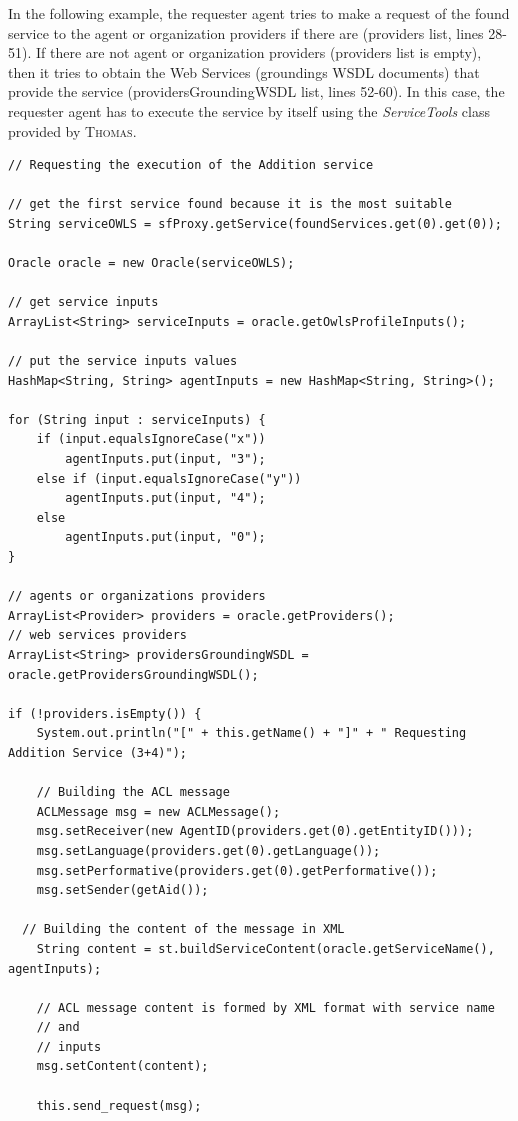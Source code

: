 In the following example, the requester agent tries to make a request of the found service to the agent or organization providers if there are (providers list, lines 28-51). If there are not agent or organization providers (providers list is empty), then it tries to obtain the Web Services (groundings WSDL documents) that provide the service (providersGroundingWSDL list, lines 52-60). In this case, the requester agent has to execute the service by itself using the \textit{ServiceTools} class provided by \textsc{Thomas}.



\begin{lstlisting}
// Requesting the execution of the Addition service

// get the first service found because it is the most suitable
String serviceOWLS = sfProxy.getService(foundServices.get(0).get(0));

Oracle oracle = new Oracle(serviceOWLS);

// get service inputs
ArrayList<String> serviceInputs = oracle.getOwlsProfileInputs();

// put the service inputs values
HashMap<String, String> agentInputs = new HashMap<String, String>();

for (String input : serviceInputs) {
	if (input.equalsIgnoreCase("x"))
		agentInputs.put(input, "3");
	else if (input.equalsIgnoreCase("y"))
		agentInputs.put(input, "4");
	else
		agentInputs.put(input, "0");
}

// agents or organizations providers
ArrayList<Provider> providers = oracle.getProviders();
// web services providers
ArrayList<String> providersGroundingWSDL = oracle.getProvidersGroundingWSDL();

if (!providers.isEmpty()) {
	System.out.println("[" + this.getName() + "]" + " Requesting Addition Service (3+4)");

	// Building the ACL message
	ACLMessage msg = new ACLMessage();
	msg.setReceiver(new AgentID(providers.get(0).getEntityID()));
	msg.setLanguage(providers.get(0).getLanguage());
	msg.setPerformative(providers.get(0).getPerformative());
	msg.setSender(getAid());
  
  // Building the content of the message in XML
	String content = st.buildServiceContent(oracle.getServiceName(), agentInputs);

	// ACL message content is formed by XML format with service name
	// and
	// inputs
	msg.setContent(content);

	this.send_request(msg);


\end{lstlisting}
